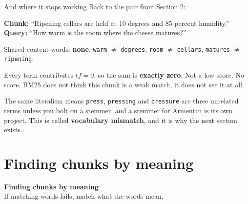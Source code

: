 \documentclass[aspectratio=169]{beamer}
\newcommand{\trapbox}[1]{%
  \begin{tcolorbox}[colback=armred!8, colframe=armred, boxrule=0.6pt, arc=2pt]
  #1
  \end{tcolorbox}}
\newcommand{\sectiontransition}[2]{%
  \begin{frame}[plain]
    \vfill
    \begin{center}
      {\Huge\bfseries\color{popblue} #1}\\[1.1em]
      {\large #2}
    \end{center}
    \vfill
  \end{frame}}
\begin{document}
\begin{frame}{And where it stops working}
  \vspace{0.2em}
  Back to the pair from Section 2:

  \vspace{0.2em}
  \begin{center}
  \begin{tcolorbox}[colback=lightbg, colframe=gray, boxrule=0.5pt, arc=2pt, width=0.86\textwidth]
    \small
    \textbf{Chunk:} ``Ripening cellars are held at 10 degrees and 85 percent humidity.''\\
    \textbf{Query:} ``How warm is the room where the cheese matures?''
  \end{tcolorbox}
  \end{center}

  \vspace{0.3em}
  Shared content words: \textbf{none}. \texttt{warm} $\neq$ \texttt{degrees},
  \texttt{room} $\neq$ \texttt{cellars}, \texttt{matures} $\neq$ \texttt{ripening}.

  \vspace{0.4em}
  \trapbox{Every term contributes $tf = 0$, so the sum is \textbf{exactly zero}. Not a low
  score. No score. BM25 does not think this chunk is a weak match, it does not see it at all.

  \vspace{0.4em}
  The same literalism means \texttt{press}, \texttt{pressing} and \texttt{pressure} are three
  unrelated terms unless you bolt on a stemmer, and a stemmer for Armenian is its own
  project. This is called \textbf{vocabulary mismatch}, and it is why the next section
  exists.}
\end{frame}

\section{Finding chunks by meaning}
\sectiontransition{Finding chunks by meaning}{If matching words fails, match what the words
mean.}
\end{document}
